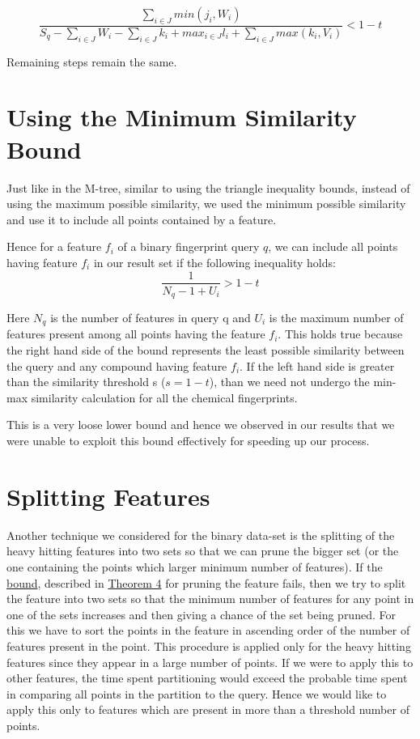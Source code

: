 \begin{equation}
\label{nonbineq2}
\frac{\sum\limits_{i \in J}min(j_i,W_i)}{S_q - \sum\limits_{i \in J}W_i -\sum\limits_{i \in J}k_i + max_{i \in J}l_i + \sum\limits_{i \in J}max (k_i, V_i)}  < 1-t
\end{equation}	

Remaining steps remain the same.

\section{Using the Minimum Similarity Bound}

Just like in the M-tree, similar to using the triangle inequality bounds, instead of using the maximum possible similarity, we used the minimum possible similarity and use it to include all points contained by a feature.

Hence for a feature $f_i$ of a binary fingerprint query $q$, we can include all points having feature $f_i$ in our result set if the following inequality holds:\\
\begin{equation}
\frac{1}{N_q - 1 + U_{i}}  > 1-t
\end{equation}

Here $N_q$ is the number of features in query q and $U_{i}$ is the maximum number of features present among all points having the feature $f_i$. This holds true because the right hand side of the bound represents the least possible similarity between the query and any compound having feature $f_i$. If the left hand side is greater than the similarity threshold s ($s=1-t$), than we need not undergo the min-max similarity calculation for all the chemical fingerprints.

This is a very loose lower bound and hence we observed in our results that we were unable to exploit this bound effectively for speeding up our process.
	


\section{Splitting Features}
\label{splitf}
Another technique we considered for the binary data-set is the splitting of the heavy hitting features into two sets so that we can prune the bigger set (or the one containing the points which larger minimum number of features). If the \hyperref[thm2bound]{bound}, described in \hyperref[thm2bound]{Theorem 4} for pruning the feature fails, then we try to split the feature into two sets so that the minimum number of features for any point in one of the sets increases and then giving a chance of the set being pruned. For this we have to sort the points in the feature in ascending order of the number of features present in the point. This procedure is applied only for the heavy hitting features since they appear in a large number of points. If we were to apply this to other features, the time spent partitioning would exceed the probable time spent in comparing all points in the partition to the query. Hence we would like to apply this only to features which are present in more than a threshold number of points.\\

